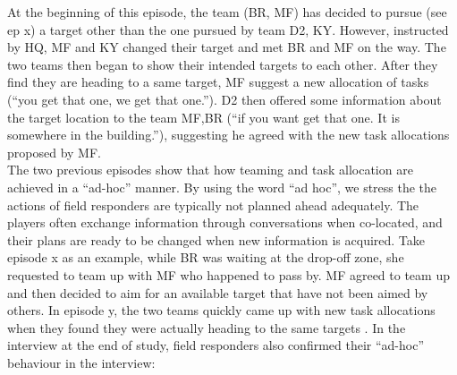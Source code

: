 \hfill \break
\noindent{} 

At the beginning of this episode, the team (BR, MF) has decided to pursue (see ep x) a target other than the one pursued by team D2, KY. However, instructed by HQ, MF and KY changed their target and met BR and MF on the way. The two teams then began to show their intended targets to each other. After they find they are heading to a same target, MF suggest a new allocation of tasks (``you get that one, we get that one.''). D2 then offered some information about the target location to the team MF,BR (``if you want get that one. It is somewhere in the building.''), suggesting he agreed with the new task allocations proposed by MF. \\

The two previous episodes show that how teaming and task allocation are achieved in a ``ad-hoc'' manner. By using the word ``ad hoc'', we stress the the actions of field responders are typically not planned ahead adequately. The players often exchange information through conversations when co-located, and their plans are ready to be changed when new information is acquired. Take episode x as an example, while BR was waiting at the drop-off zone, she requested to team up with MF who happened to pass by. MF agreed to team up and then decided to aim for an available target that have not been aimed by others. In episode y, the two teams quickly came up with new task allocations when they found they were actually heading to the same targets . In the interview at the end of study, field responders also confirmed their ``ad-hoc'' behaviour in the interview:\\

